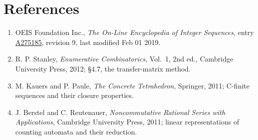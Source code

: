 \documentclass[11pt]{article}
\theoremstyle{definition}
\begin{document}
\section{References}

\begin{enumerate}

\item OEIS Foundation Inc., \emph{The On-Line Encyclopedia of Integer Sequences}, entry \href{https://oeis.org/A275185}{A275185}, revision 9, last modified Feb 01 2019.

\item R. P. Stanley, \emph{Enumerative Combinatorics}, Vol.~1, 2nd ed., Cambridge University Press, 2012; \S4.7, the transfer-matrix method.

\item M. Kauers and P. Paule, \emph{The Concrete Tetrahedron}, Springer, 2011; C-finite sequences and their closure properties.

\item J. Berstel and C. Reutenauer, \emph{Noncommutative Rational Series with Applications}, Cambridge University Press, 2011; linear representations of counting automata and their reduction.

\end{enumerate}
\end{document}
